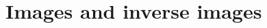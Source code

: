 \documentclass[../../main.tex]{subfiles}
\begin{document}
\ifmainfile
\else
    \maketitle
    \addtocounter{chapter}{3}
    \addtocounter{section}{3}
    \section{Images and inverse images}
\fi
\end{document}
